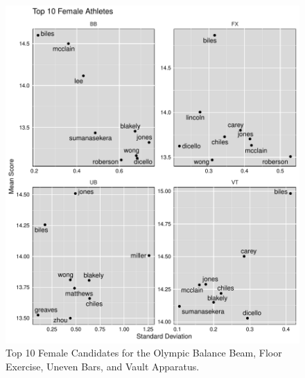 \documentclass[12pt]{article}
\begin{document}
\begin{figure}
  \centering
  \includegraphics[scale=0.7]{FinalFemaleApparatusPlot.pdf}
  \caption{Top 10 Female Candidates for the Olympic Balance Beam, Floor Exercise, Uneven Bars, and Vault Apparatus.}
  \label{fig:FA}
\end{figure}
\end{document}
